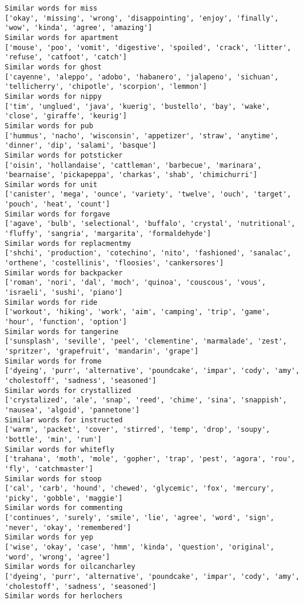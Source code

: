 \documentclass[11pt]{article}
\begin{document}
\begin{Verbatim}[commandchars=\\\{\}]
Similar words for miss
['okay', 'missing', 'wrong', 'disappointing', 'enjoy', 'finally', 'wow', 'kinda', 'agree', 'amazing']
Similar words for apartment
['mouse', 'poo', 'vomit', 'digestive', 'spoiled', 'crack', 'litter', 'refuse', 'catfoot', 'catch']
Similar words for ghost
['cayenne', 'aleppo', 'adobo', 'habanero', 'jalapeno', 'sichuan', 'tellicherry', 'chipotle', 'scorpion', 'lemmon']
Similar words for nippy
['tim', 'unglued', 'java', 'kuerig', 'bustello', 'bay', 'wake', 'close', 'giraffe', 'keurig']
Similar words for pub
['hummus', 'nacho', 'wisconsin', 'appetizer', 'straw', 'anytime', 'dinner', 'dip', 'salami', 'basque']
Similar words for potsticker
['oisin', 'hollandaise', 'cattleman', 'barbecue', 'marinara', 'bearnaise', 'pickapeppa', 'charkas', 'shab', 'chimichurri']
Similar words for unit
['canister', 'mega', 'ounce', 'variety', 'twelve', 'ouch', 'target', 'pouch', 'heat', 'count']
Similar words for forgave
['agave', 'bulb', 'selectional', 'buffalo', 'crystal', 'nutritional', 'fluffy', 'sangria', 'margarita', 'formaldehyde']
Similar words for replacmentmy
['shchi', 'production', 'cotechino', 'nito', 'fashioned', 'sanalac', 'orthene', 'costellinis', 'floosies', 'cankersores']
Similar words for backpacker
['roman', 'nori', 'dal', 'moch', 'quinoa', 'couscous', 'vous', 'israeli', 'sushi', 'piano']
Similar words for ride
['workout', 'hiking', 'work', 'aim', 'camping', 'trip', 'game', 'hour', 'function', 'option']
Similar words for tangerine
['sunsplash', 'seville', 'peel', 'clementine', 'marmalade', 'zest', 'spritzer', 'grapefruit', 'mandarin', 'grape']
Similar words for frome
['dyeing', 'purr', 'alternative', 'poundcake', 'impar', 'cody', 'amy', 'cholestoff', 'sadness', 'seasoned']
Similar words for crystallized
['crystalized', 'ale', 'snap', 'reed', 'chime', 'sina', 'snappish', 'nausea', 'algoid', 'pannetone']
Similar words for instructed
['warm', 'packet', 'cover', 'stirred', 'temp', 'drop', 'soupy', 'bottle', 'min', 'run']
Similar words for whitefly
['trahana', 'moth', 'mole', 'gopher', 'trap', 'pest', 'agora', 'rou', 'fly', 'catchmaster']
Similar words for stoop
['cal', 'carb', 'hound', 'chewed', 'glycemic', 'fox', 'mercury', 'picky', 'gobble', 'maggie']
Similar words for commenting
['continues', 'surely', 'smile', 'lie', 'agree', 'word', 'sign', 'never', 'okay', 'remembered']
Similar words for yep
['wise', 'okay', 'case', 'hmm', 'kinda', 'question', 'original', 'word', 'wrong', 'agree']
Similar words for oilcancharley
['dyeing', 'purr', 'alternative', 'poundcake', 'impar', 'cody', 'amy', 'cholestoff', 'sadness', 'seasoned']
Similar words for herlochers

\end{Verbatim}
\end{document}
